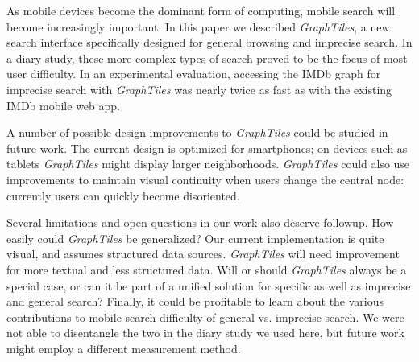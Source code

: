 As mobile devices become the dominant form of computing, mobile search will become increasingly important. In this paper we described \textit{GraphTiles}, a new search interface specifically designed for general browsing and imprecise search. In a diary study, these more complex types of search proved to be the focus of most user difficulty. In an experimental evaluation, accessing the IMDb graph for imprecise search with \textit{GraphTiles} was nearly twice as fast as with the existing IMDb mobile web app.

A number of possible design improvements to \textit{GraphTiles} could be studied in future work. The current design is optimized for smartphones; on devices such as tablets \textit{GraphTiles} might display larger neighborhoods. \textit{GraphTiles} could also use improvements to maintain visual continuity when users change the central node: currently users can quickly become disoriented. 

Several limitations and open questions in our work also deserve followup. How easily could \textit{GraphTiles} be generalized? Our current implementation is quite visual, and assumes structured data sources. \textit{GraphTiles} will need improvement for more textual and less structured data. Will or should \textit{GraphTiles} always be a special case, or can it be part of a unified solution for specific as well as imprecise and general search? Finally, it could be profitable to learn about the various contributions to mobile search difficulty of general vs. imprecise search. We were not able to disentangle the two in the diary study we used here, but future work might employ a different measurement method.
